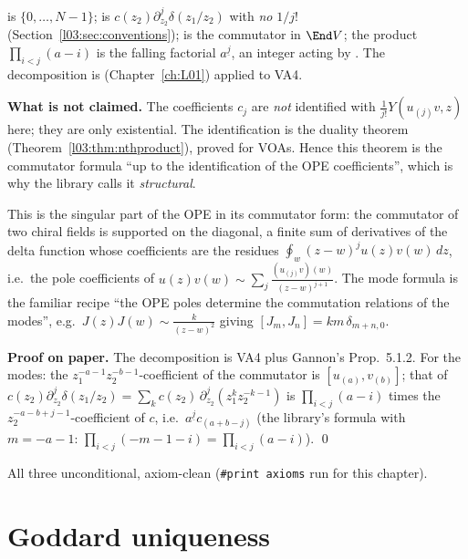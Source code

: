 \begin{dictionary}
 is $\{0,\dots,N-1\}$;  is $c(z_2)\partial_{z_2}^j\delta(z_1/z_2)$
with \emph{no} $1/j!$ (Section~\ref{l03:sec:conventions});  is the commutator in
$\End V$; the product $\prod_{i<j}(a-i)$ is the falling factorial $a^{\underline j}$, an integer acting
by . The decomposition is  (Chapter~\ref{ch:L01}) applied to VA4.

\textbf{What is not claimed.} The coefficients $c_j$ are \emph{not} identified with
$\frac1{j!}Y(u_{(j)}v,z)$ here; they are only existential. The identification is the duality
theorem  (Theorem~\ref{l03:thm:nthproduct}), proved for VOAs. Hence this theorem is
the commutator formula ``up to the identification of the OPE coefficients'', which is why the
library calls it \emph{structural}.
\end{dictionary}

\begin{physics}
This is the singular part of the OPE in its commutator form: the commutator of two chiral fields is
supported on the diagonal, a finite sum of derivatives of the delta function whose coefficients are
the residues $\oint_w(z-w)^j u(z)v(w)\,dz$, i.e.\ the pole coefficients of $u(z)v(w)\sim
\sum_j\frac{(u_{(j)}v)(w)}{(z-w)^{j+1}}$. The mode formula is the familiar recipe ``the OPE poles
determine the commutation relations of the modes'', e.g.\ $J(z)J(w)\sim\frac{k}{(z-w)^2}$ giving
$[J_m,J_n] = km\,\delta_{m+n,0}$.
\end{physics}

\textbf{Proof on paper.} The decomposition is VA4 plus Gannon's Prop.~5.1.2. For the modes: the
$z_1^{-a-1}z_2^{-b-1}$-coefficient of the commutator is $[u_{(a)},v_{(b)}]$; that of
$c(z_2)\partial_{z_2}^j\delta(z_1/z_2) = \sum_{k}c(z_2)\,\partial_{z_2}^j(z_1^kz_2^{-k-1})$ is
$\prod_{i<j}(a-i)$ times the $z_2^{-a-b+j-1}$-coefficient of $c$, i.e.\ $a^{\underline j}c_{(a+b-j)}$ (the
library's formula with $m = -a-1$: $\prod_{i<j}(-m-1-i) = \prod_{i<j}(a-i)$). \qed

\begin{status}
All three unconditional, axiom-clean (\texttt{\#print axioms}  run for this
chapter).
\end{status}

\section{Goddard uniqueness}\label{l03:sec:goddard}

